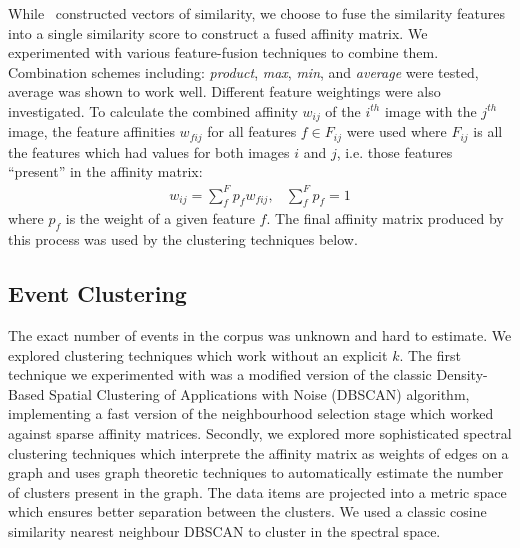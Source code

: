 \documentclass{../acm_proc_article-me11_tweaked}
\begin{document}
While~\cite{Reuter2012ECS23247962324824} constructed vectors of similarity, we choose to fuse the similarity features into a single similarity score to construct a fused affinity matrix. We experimented with various feature-fusion techniques to combine them. Combination schemes including: \emph{product}, \emph{max}, \emph{min}, and \emph{average} were tested, average was shown to work well. Different feature weightings were also investigated. To calculate the combined affinity $w_{ij}$ of the $i^{th}$ image with the $j^{th}$ image, the feature affinities $w_{fij}$ for all features $f\in F_{ij}$ were used where $F_{ij}$ is all the features which had values for both images $i$ and $j$, i.e. those features ``present'' in the affinity matrix:
\begin{eqnarray}
 w_{ij} = \sum\limits_{f}^F p_{f} w_{fij},&\sum\limits_{f}^F p_{f} = 1
\end{eqnarray}
where $p_{f}$ is the weight of a given feature $f$. The final affinity matrix produced by this process was used by the clustering techniques below.


\subsection{Event Clustering} %
\label{sub:event_clustering}

The exact number of events in the corpus was unknown and hard to estimate. We explored clustering techniques which work without an explicit $k$. The first technique we experimented with was a modified version of the classic Density-Based Spatial Clustering of Applications with Noise (DBSCAN) algorithm, implementing a fast version of the neighbourhood selection stage which worked against sparse affinity matrices. Secondly, we explored more sophisticated spectral clustering techniques which interprete the affinity matrix as weights of edges on a graph and uses graph theoretic techniques to automatically estimate the number of clusters present in the graph. The data items are projected into a metric space which ensures better separation between the clusters. We used a classic cosine similarity nearest neighbour DBSCAN to cluster in the spectral space. 
\end{document}
